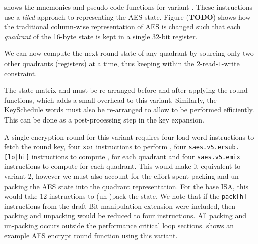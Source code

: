 
 shows the mnemonics and pseudo-code functions
for variant .
These instructions use a {\em tiled} approach to representing the
AES state.
Figure ({\bf TODO}) shows how the traditional column-wise representation
of AES is changed such that each {\em quadrant} of the 16-byte state
is kept in a single $32$-bit register.

We can now compute the next round state of any quadrant by sourcing
only two other quadrants (registers) at a time, thus keeping within
the $2$-read-$1$-write constraint.

The state matrix and must be re-arranged before and after applying
the round functions, which adds a small overhead to this variant.
Similarly, the KeySchedule words must also be re-arranged to allow
 to be performed efficiently.
This can be done as a post-processing step in the key expansion.

A single encryption round for this variant requires
four load-word instructions to fetch the round key,
four {\tt xor} instructions to perform ,
four {\tt saes.v5.ersub.[lo|hi]} instructions to compute
    ,  for each quadrant
and
four {\tt saes.v5.emix} instructions to compute  for each
quadrant.
This would make it equivalent to variant 2, however we must also
account for the effort spent packing and un-packing the AES
state into the quadrant representation.
For the base ISA, this would take $12$ instructions to (un-)pack the state.
We note that if the {\tt pack[h]} instructions from the draft
Bit-manipulation extension were included, then packing and unpacking
would be reduced to four instructions.
All packing and un-packing occurs outside the performance critical
loop sections.
 shows an example AES encrypt round function
using this variant.


